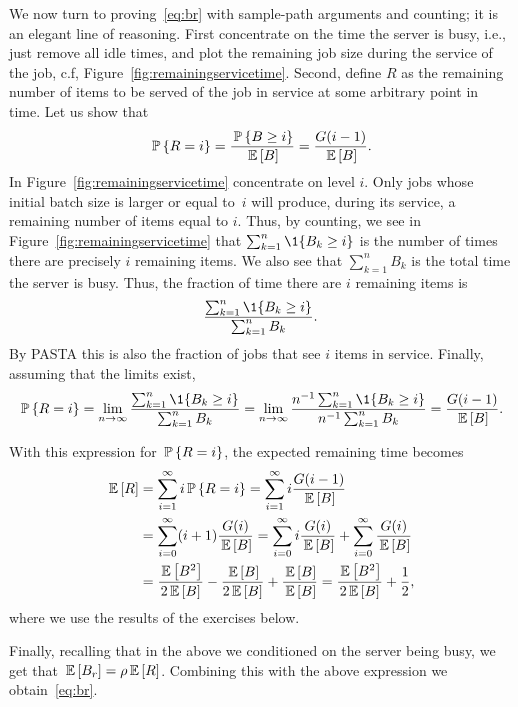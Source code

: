 We now turn to proving~\eqref{eq:br} with sample-path arguments and
counting; it is an elegant line of reasoning. First concentrate on the
time the server is busy, i.e., just remove all idle times, and plot
the remaining job size during the service of the job, c.f,
Figure~\ref{fig:remainingservicetime}. Second, define $R$ as the
remaining number of items to be served of the job in service at some
arbitrary point in time. Let us show that
\begin{equation*}
  \P{R=i} =\frac{\P{B\geq i}}{\E B} = \frac{G(i-1)}{\E B}.
\end{equation*}
In Figure~\ref{fig:remainingservicetime} concentrate on level
$i$. Only jobs whose initial batch size is larger or equal to~$i$ will
produce, during its service, a remaining number of items equal to $i$.
Thus, by counting, we see in Figure~\ref{fig:remainingservicetime}
that $\sum_{k=1}^n \1{B_k \geq i}$ is the number of times there are
precisely $i$ remaining items.  We also see that $\sum_{k=1}^n B_k$ is
the total time the server is busy. Thus, the fraction of time there
are $i$ remaining items is
\begin{equation*}
  \frac{\sum_{k=1}^n \1{B_k \geq i}}{\sum_{k=1}^n B_k}.
\end{equation*}
By PASTA this is also the fraction of jobs that see $i$ items in
service.  Finally, assuming that the limits exist,
\begin{equation*}
\P{R=i} = \lim_{n\to\infty} \frac{\sum_{k=1}^n \1{B_k \geq i}}{\sum_{k=1}^n B_k} 
= \lim_{n\to\infty}  \frac{n^{-1}\sum_{k=1}^n \1{B_k \geq i}}{n^{-1}\sum_{k=1}^n B_k} = \frac{G(i-1)}{\E B}.
\end{equation*}

With this expression for $\P{R=i}$, the expected remaining time becomes
\begin{equation*}
  \begin{split}
  \E{R} 
&= \sum_{i=1}^\infty i \P{R=i} = \sum_{i=1}^\infty i \frac{G(i-1)}{\E B} \\
&=\sum_{i=0}^\infty (i+1) \frac{G(i)}{\E B} 
=\sum_{i=0}^\infty i \frac{G(i)}{\E B} +
\sum_{i=0}^\infty \frac{G(i)}{\E B}\\
&= \frac{\E{B^2}}{2\E B} - \frac{\E B}{2\E B} + \frac{\E B}{\E B} = \frac{\E{B^2}}{2\E B} + \frac{1}2,
  \end{split}
\end{equation*}
where we use the results of the exercises below.

Finally, recalling that in the above we conditioned on the server
being busy, we get that $\E{B_r} = \rho \E R$.  Combining this with
the above expression we obtain~\eqref{eq:br}.

